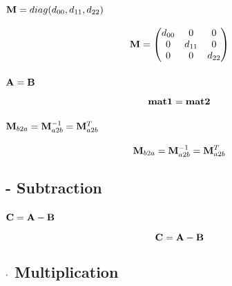 \subsubsection*{$\mathbf{M} = diag(d_{00}, d_{11}, d_{22})$}
\begin{equation}
\mathbf{M} = \begin{pmatrix}
d_{00} & 0 & 0 \\
0 & d_{11} & 0 \\
0 & 0 & d_{22}
\end{pmatrix}
\end{equation}

\subsubsection*{$\mathbf{A} = \mathbf{B}$}
\begin{equation}
\mathbf{mat1} = \mathbf{mat2}
\end{equation}


\subsubsection*{$\mathbf{M}_{b2a} = \mathbf{M}_{a2b}^{-1} = \mathbf{M}_{a2b}^{T}$}
\begin{equation}
\mathbf{M}_{b2a} = \mathbf{M}_{a2b}^{-1} = \mathbf{M}_{a2b}^{T}
\end{equation}

\subsection{- Subtraction}
\subsubsection*{$\mathbf{C} = \mathbf{A} - \mathbf{B}$}
\begin{equation}
\mathbf{C} = \mathbf{A} - \mathbf{B}
\end{equation}



\subsection{$\cdot$ Multiplication}
